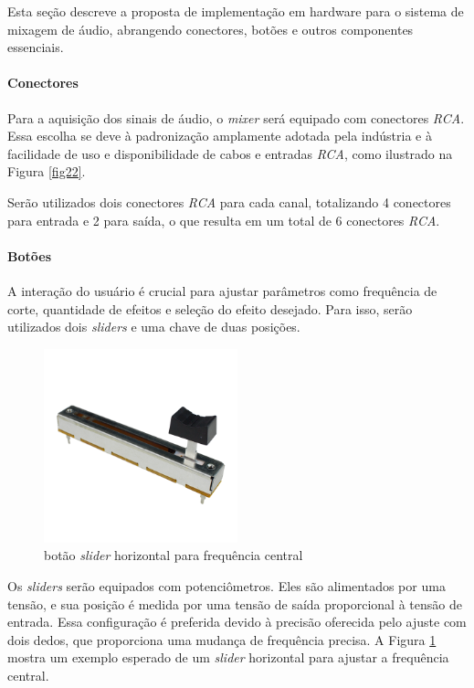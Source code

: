 Esta seção descreve a proposta de implementação em hardware para o sistema de mixagem de áudio, abrangendo conectores, botões e outros componentes essenciais.



\paragraph{Conectores}
Para a aquisição dos sinais de áudio, o \textit{mixer} será equipado com conectores \textit{RCA}. Essa escolha se deve à padronização amplamente adotada pela indústria e à facilidade de uso e disponibilidade de cabos e entradas \textit{RCA}, como ilustrado na Figura \ref{fig22}.

Serão utilizados dois conectores \textit{RCA} para cada canal, totalizando 4 conectores para entrada e 2 para saída, o que resulta em um total de 6 conectores \textit{RCA}.

\paragraph{Botões}
A interação do usuário é crucial para ajustar parâmetros como frequência de corte, quantidade de efeitos e seleção do efeito desejado. Para isso, serão utilizados dois \textit{sliders} e uma chave de duas posições.


\begin{figure}[h]
    \centering
    \includegraphics[width=0.5\textwidth]{figuras/fig61.png}
    \caption{botão \textit{slider} horizontal para frequência central \cite{robocore}}
    \label{fig61}
\end{figure}

Os \textit{sliders} serão equipados com potenciômetros. Eles são alimentados por uma tensão, e sua posição é medida por uma tensão de saída proporcional à tensão de entrada. Essa configuração é preferida devido à precisão oferecida pelo ajuste com dois dedos, que proporciona uma mudança de frequência precisa. A Figura \ref{fig61} mostra um exemplo esperado de um \textit{slider} horizontal para ajustar a frequência central.

